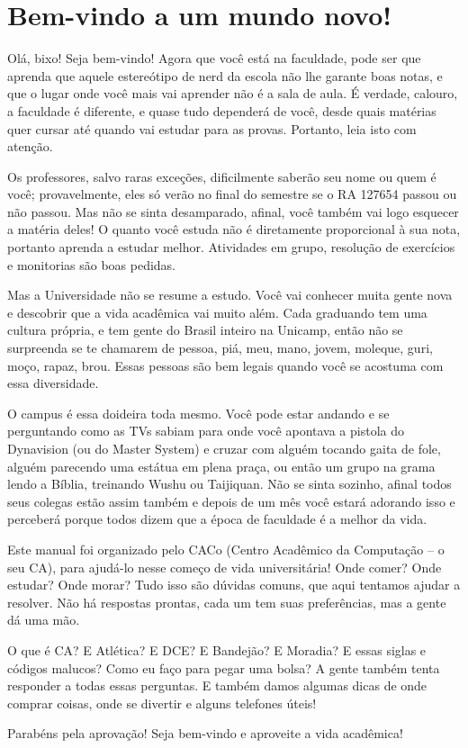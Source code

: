
\section{Bem-vindo a um mundo novo!}

Olá, bixo! Seja bem-vindo! Agora que você está na faculdade, pode ser que aprenda que aquele estereótipo de nerd
da escola não lhe garante boas notas, e que o lugar onde você mais vai aprender não
é a sala de aula. É verdade, calouro, a faculdade é diferente, e quase tudo
dependerá de você, desde quais matérias quer cursar até quando vai estudar para
as provas. Portanto, leia isto com atenção.

Os professores, salvo raras exceções, dificilmente saberão seu nome ou quem é você; provavelmente, eles só verão
no final do semestre se o RA 127654  passou ou não passou. Mas não se sinta
desamparado, afinal, você também vai logo esquecer a matéria deles! O quanto você
estuda não é diretamente proporcional à sua nota, portanto aprenda a estudar
melhor. Atividades em grupo, resolução de exercícios e monitorias são boas pedidas.

Mas a Universidade não se resume a estudo. Você vai conhecer muita gente nova e
descobrir que a vida acadêmica vai muito além.
Cada graduando tem uma cultura própria, e tem gente do
Brasil inteiro na Unicamp, então não se surpreenda se te chamarem de
pessoa, piá, meu, mano, jovem, moleque, guri, moço, rapaz,
brou. Essas pessoas são bem legais quando você se acostuma com essa
diversidade.

O campus é essa doideira toda mesmo. Você pode estar andando e se perguntando
como as TVs sabiam para onde você apontava a pistola do Dynavision (ou do
Master System) e cruzar com alguém tocando gaita de fole, alguém parecendo uma
estátua em plena praça, ou então um grupo na grama lendo a Bíblia, treinando
Wushu ou Taijiquan. Não se sinta sozinho, afinal todos seus colegas estão assim
também e depois de um mês você estará adorando isso e perceberá porque todos
dizem que a época de faculdade é a melhor da vida.

Este manual foi organizado pelo CACo (Centro Acadêmico da Computação -- o seu
CA), para ajudá-lo nesse começo de vida universitária! Onde comer? Onde estudar?
Onde morar? Tudo isso são dúvidas comuns, que aqui tentamos ajudar a resolver.
Não há respostas prontas, cada um tem suas preferências, mas a gente dá uma mão.

O que é CA? E Atlética? E DCE? E Bandejão? E Moradia? E essas siglas e códigos
malucos? Como eu faço para pegar uma bolsa? A gente também tenta responder a todas
essas perguntas. E também damos algumas dicas de onde comprar coisas, onde se
divertir e alguns telefones úteis!

Parabéns pela aprovação! Seja bem-vindo e aproveite a vida acadêmica!
